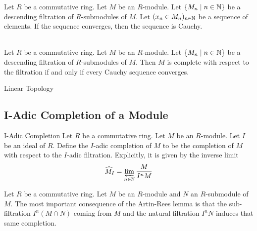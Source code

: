 \documentclass[a4paper]{article}
\begin{document}
\begin{lmm}{}{} Let $R$ be a commutative ring. Let $M$ be an $R$-module. Let $\{M_n\;|\;n\in\mathbb{N}\}$ be a descending filtration of $R$-submodules of $M$. Let $(x_n\in M_n)_{n\in\mathbb{N}}$ be a sequence of elements. If the sequence converges, then the sequence is Cauchy. 
\end{lmm}

\begin{prp}{}{}\\
Let $R$ be a commutative ring. Let $M$ be an $R$-module. Let $\{M_n\;|\;n\in\mathbb{N}\}$ be a descending filtration of $R$-submodules of $M$. Then $M$ is complete with respect to the filtration if and only if every Cauchy sequence converges. 
\end{prp}

\begin{defn}{Linear Topology}{}
\end{defn}

\subsection{I-Adic Completion of a Module}
\begin{defn}{I-Adic Completion}{} Let $R$ be a commutative ring. Let $M$ be an $R$-module. Let $I$ be an ideal of $R$. Define the $I$-adic completion of $M$ to be the completion of $M$ with respect to the $I$-adic filtration. Explicitly, it is given by the inverse limit $$\widehat{M}_I=\varprojlim_{n\in\mathbb{N}}\frac{M}{I^nM}$$
\end{defn}

Let $R$ be a commutative ring. Let $M$ be an $R$-module and $N$ an $R$-submodule of $M$. The most important consequence of the Artin-Rees lemma is that the sub-filtration $I^n(M\cap N)$ coming from $M$ and the natural filtration $I^nN$ induces that same completion. 
\end{document}
